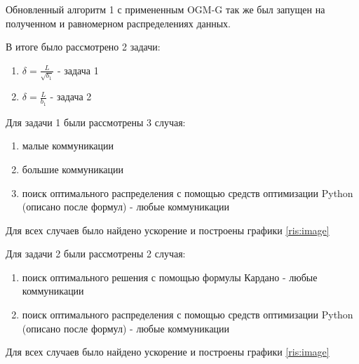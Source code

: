 \documentclass{article}
\begin{document}
Обновленный алгоритм 1 с примененным OGM-G так же был запущен на полученном и равномерном распределениях данных.

В итоге было рассмотрено 2 задачи: 
\begin{enumerate}
    \item $\delta = \frac{L}{\sqrt{b_1}}$ - задача 1
    \item $\delta = \frac{L}{b_1}$ - задача 2
\end{enumerate}

Для задачи 1 были рассмотрены 3 случая:
\begin{enumerate}
    \item малые коммуникации
    \item большие коммуникации
    \item поиск оптимального распределения с помощью средств оптимизации Python (описано после формул) - любые коммуникации
\end{enumerate}

Для всех случаев было найдено ускорение и построены графики \ref{ris:image}

Для задачи 2 были рассмотрены 2 случая:
\begin{enumerate}
    \item поиск оптимального решения с помощью формулы Кардано - любые коммуникации
    \item поиск оптимального распределения с помощью средств оптимизации Python (описано после формул) - любые коммуникации
\end{enumerate}

Для всех случаев было найдено ускорение и построены графики \ref{ris:image}
\end{document}
